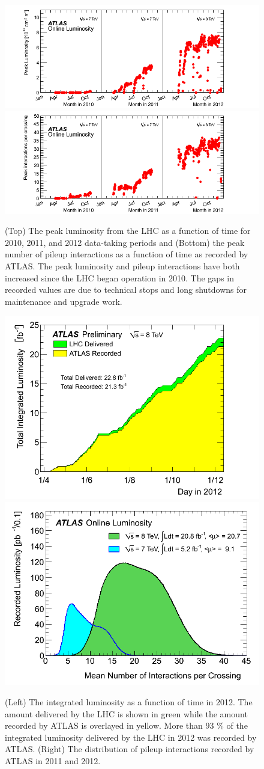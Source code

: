\begin{figure}[ht]
\centering
\includegraphics[width=.9\textwidth]{figures/lhc/peaklumi_multiyear.png}
\includegraphics[width=.9\textwidth]{figures/lhc/peakmu_multiyear.png}
\caption{ (Top) The peak luminosity from the LHC as a function of time
for 2010, 2011, and 2012 data-taking periods and (Bottom)
the peak number of pileup interactions as a function of time
as recorded by ATLAS. The peak luminosity and pileup interactions
have both increased since the LHC began operation in 2010.
The gaps in recorded values are due to technical stops and long shutdowns
for maintenance and upgrade work.  }
\label{fig:lhc_conditions}
\end{figure}

\begin{figure}[ht]
\centering
\includegraphics[width=.45\textwidth]{figures/lhc/integratedlumi.png}
\includegraphics[width=.45\textwidth]{figures/lhc/pileup.png}
\caption{ (Left) The integrated luminosity as a function of time in 2012. The amount
delivered by the LHC is shown in green while the amount recorded by ATLAS
is overlayed in yellow. More than 93 \% of the integrated luminosity 
delivered by the LHC in 2012 was recorded by ATLAS.  
(Right) The distribution of pileup interactions recorded by ATLAS in 2011 and 2012.  }
\label{fig:lhc_lumi}
\end{figure}

